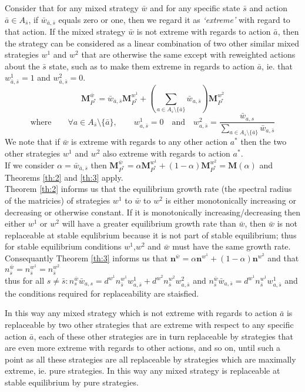 Consider that for any mixed strategy $\bar{w}$ and for any specific state $\bar{s}$ and action $\bar{a}\in A_{\bar{s}}$, if $\bar{w}_{\bar{a},\bar{s}}$ equals zero or one, then we regard it as \textit{`extreme'} with regard to that action.
If the mixed strategy $\bar{w}$ is not extreme with regards to action $\bar{a}$, then the strategy can be considered as a linear combination of two other similar mixed strategies $w^1$ and $w^2$ that are otherwise the same except with reweighted actions about the $\bar{s}$ state, such as to make them extreme in regards to action $\bar{a}$, ie. that $w^1_{\bar{a},\bar{s}}=1$ and $w^2_{\bar{a},\bar{s}}=0$.
$$ \mathbf{M}_{P^*}^{\bar{w}} = \bar{w}_{\bar{a},\bar{s}}\mathbf{M}_{P^*}^{w^1} + \left(\sum_{a\in A_{\bar{s}}\setminus \{\bar{a}\}} \bar{w}_{a,\bar{s}}\right)\mathbf{M}_{P^*}^{w^2} $$
$$\text{where}\qquad \forall a\in A_{\bar{s}}\setminus \{\bar{a}\},\qquad  w^1_{a,\bar{s}}=0 \quad\text{and}\quad w^2_{a,\bar{s}} = \frac{\bar{w}_{a,s}}{\sum_{a\in A_{\bar{s}}\setminus \{\bar{a}\}} \bar{w}_{a,\bar{s}}} $$
We note that if $\bar{w}$ is extreme with regards to any other action $a^*$ then the two other strategies $w^1$ and $w^2$ also extreme with regards to action $a^*$.\\
If we consider $\alpha = \bar{w}_{\bar{a},\bar{s}}$ then $\mathbf{M}_{P^*}^{\bar{w}} = \alpha\mathbf{M}_{P^*}^{w^1} + (1-\alpha)\mathbf{M}_{P^*}^{w^2} = \mathbf{M}(\alpha)$ and Theorems \ref{th:2} and \ref{th:3} apply.\\
Theorem \ref{th:2} informs us that the equilibrium growth rate (the spectral radius of the matricies) of strategies $w^1$ to $\bar{w}$ to $w^2$ is either monotonically increasing or decreasing or otherwise constant.
If it is monotonically increasing/decreasing then either $w^1$ or $w^2$ will have a greater equilibrium growth rate than $\bar{w}$, then $\bar{w}$ is not replaceable at stable equlibrium because it is not part of stable equilibrium; thus for stable equilibrium conditions $w^1$,$w^2$ and $\bar{w}$ must have the same growth rate.\\
Consequantly Theorem \ref{th:3} informs us that $\mathbf{n}^{\bar{w}} = \alpha \mathbf{n}^{w^1} + (1-\alpha)\mathbf{n}^{w^2}$ and that $n^{\bar{w}}_{\bar{s}} = n^{w^1}_{\bar{s}} = n^{w^2}_{\bar{s}}$\\
thus for all $s\ne \bar{s}: n^{\bar{w}}_s\bar{w}_{a,s} = d^{w^1}n^{w^1}_{\bar{s}}w^1_{a,\bar{s}} + d^{w^2}n^{w^2}_{\bar{s}}w^2_{a,\bar{s}}$ and $n^{\bar{w}}_{\bar{s}}\bar{w}_{a,\bar{s}} = d^{w^1}n^{w^1}_{\bar{s}}w^1_{a,\bar{s}}$ and the conditions required for replaceability are staisfied.


In this way any mixed strategy which is not extreme with regards to action $\bar{a}$ is replaceable by two other strategies that are extreme with respect to any specific action $\bar{a}$, each of these other strategies are in turn replaceable by strategies that are even more extreme with regards to other actions, and so on, until such a point as all these strategies are all replaceable by strategies which are maximally extreme, ie. pure strategies.
In this way any mixed strategy is replaceable at stable equilibrium by pure strategies.



